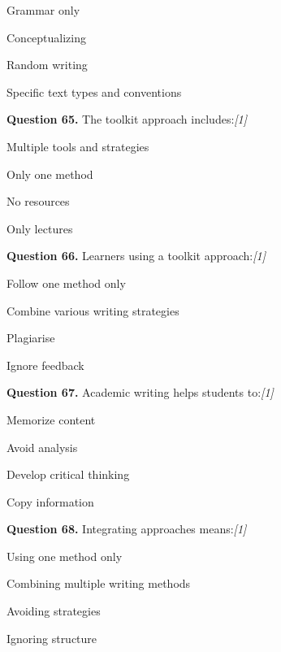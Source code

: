 \documentclass[11pt,a4paper]{article}
\newcommand{\pts}[1]{\hfill   \textit{[#1]}}
\begin{document}
\begin{parts}
  \item Grammar only
  \item Conceptualizing
  \item Random writing
  \item Specific text types and conventions
\end{parts}

\medskip




\noindent   \textbf{Question 65.} The toolkit approach includes:\pts{1}

\begin{parts}
  \item Multiple tools and strategies
  \item Only one method
  \item No resources
  \item Only lectures
\end{parts}

\medskip




\noindent   \textbf{Question 66.} Learners using a toolkit approach:\pts{1}

\begin{parts}
  \item Follow one method only
  \item Combine various writing strategies
  \item Plagiarise
  \item Ignore feedback
\end{parts}

\medskip




\noindent   \textbf{Question 67.} Academic writing helps students to:\pts{1}

\begin{parts}
  \item Memorize content
  \item Avoid analysis
  \item Develop critical thinking
  \item Copy information
\end{parts}

\medskip




\noindent   \textbf{Question 68.} Integrating approaches means:\pts{1}

\begin{parts}
  \item Using one method only
  \item Combining multiple writing methods
  \item Avoiding strategies
  \item Ignoring structure
\end{parts}
\end{document}

